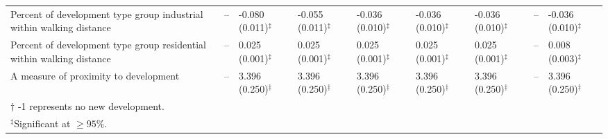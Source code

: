 \begin{tabular}{p{3in}p{0.5in}p{0.5in}p{0.5in}p{0.5in}p{0.5in}p{0.5in}p{0.5in}p{0.5in}}
Percent of development type group industrial within walking distance    &    --     &    -0.080 (0.011)$^{\ddagger}$    &    -0.055 (0.011)$^{\ddagger}$    &    -0.036 (0.010)$^{\ddagger}$    &    -0.036 (0.010)$^{\ddagger}$    &    -0.036 (0.010)$^{\ddagger}$    &    --     &    -0.036 (0.010)$^{\ddagger}$    \\
Percent of development type group residential within walking distance   &    --     &    0.025 (0.001)$^{\ddagger}$     &    0.025 (0.001)$^{\ddagger}$     &    0.025 (0.001)$^{\ddagger}$     &    0.025 (0.001)$^{\ddagger}$     &    0.025 (0.001)$^{\ddagger}$     &    --     &    0.008 (0.003)$^{\ddagger}$     \\
A measure of proximity to development   &    --     &    3.396 (0.250)$^{\ddagger}$     &    3.396 (0.250)$^{\ddagger}$     &    3.396 (0.250)$^{\ddagger}$     &    3.396 (0.250)$^{\ddagger}$     &    3.396 (0.250)$^{\ddagger}$     &    --     &    3.396 (0.250)$^{\ddagger}$     \\
\midrule
$\dagger$ -1 represents no new development.\\
$^{\ddagger}$Significant at $\geq95\%$. \\
\bottomrule
\end{tabular}

